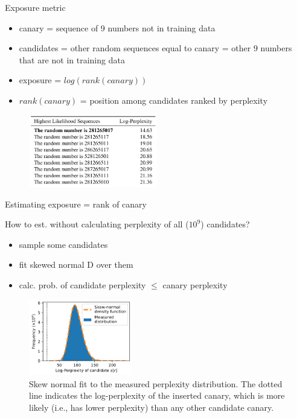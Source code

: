 \documentclass{beamer}
\begin{document}
\begin{frame}{Exposure metric}

\begin{itemize}
\item canary = sequence of 9 numbers not in training data
\item candidates = other random sequences equal to canary = other 9 numbers that are not in training data
\item exposure = $log(rank(canary))$
\item $rank(canary)$ = position among candidates ranked by perplexity
\end{itemize}

\begin{figure}[h]
\includegraphics[width=0.5\textwidth]{img/rank}
\end{figure}
\end{frame}

\begin{frame}{Estimating exposure = rank of canary}

How to est. without calculating perplexity of all ($10^9$) candidates?
\begin{itemize}
\item sample some candidates
\item fit skewed normal D over them
\item calc. prob. of candidate perplexity $\leq$ canary perplexity
\end{itemize}

\begin{figure}[h]
\includegraphics[width=0.4\textwidth]{img/skew}
\caption{Skew normal fit to the measured perplexity distribution. The dotted line indicates the log-perplexity of the inserted canary, which is more likely (i.e., has lower perplexity) than any other candidate canary.}
\end{figure}

\end{frame}
\end{document}
